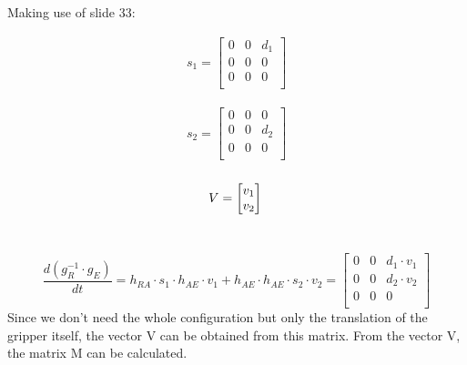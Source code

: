 \documentclass{article}
\begin{document}
	Making use of slide 33:\\
	\begin{minipage}[t]{.33\textwidth-.5\columnsep}
		\centering
		\begin{eqnarray}
		s_{1} = 
		\begin{bmatrix}
		0 & 0 & d_{1} \\
		0 & 0 & 0 \\
		0 & 0 & 0 \\
		\end{bmatrix} \nonumber
		\end{eqnarray}
	\end{minipage}%
	\begin{minipage}[t]{.33\textwidth-.5\columnsep}
		\centering
		\begin{eqnarray}
		s_{2} = 
		\begin{bmatrix}
		0 & 0 & 0 \\
		0 & 0 & d_{2} \\
		0 & 0 & 0 \\
		\end{bmatrix} \nonumber
		\end{eqnarray}
	\end{minipage}
	\begin{minipage}[t]{.33\textwidth-.5\columnsep}
		\centering
		\begin{eqnarray}
		V = 
		\begin{bmatrix}
		v_1 \\
		v_2 \\
		\end{bmatrix} \vphantom{\begin{bmatrix} 0 \\ 0\\ 0\\ \end{bmatrix} } \nonumber
		\end{eqnarray}
	\end{minipage}\\
	
	\[
	\frac{d(g_{R}^{-1} \cdot g_{E} ) }{dt} = h_{RA} \cdot s_{1} \cdot h_{AE} \cdot v_{1} + h_{AE} \cdot h_{AE} \cdot s_{2} \cdot v_{2} = 
	\begin{bmatrix}
	0 & 0 & d_{1}\cdot v_{1}\\
	0 & 0 & d_{2}\cdot v_{2} \\
	0 & 0 & 0 \\
	\end{bmatrix}
	\]
	Since we don't need the whole configuration but only the translation of the gripper itself, the vector V can be obtained from this matrix. From the vector V, the matrix M can be calculated.
	
\end{document}

